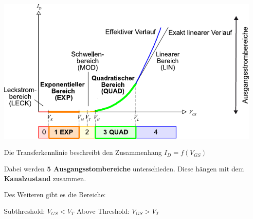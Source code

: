\begin{minipage}[t]{0.55\columnwidth}
    \includegraphics[width=\columnwidth, align=t]{images/MOSFET_transferkennlinie.pdf}
\end{minipage}
\hfill
\begin{minipage}[t]{0.42\columnwidth}
    Die Transferkennlinie beschreibt den Zusammenhang $I_D = f(V_{GS})$ 

    \smallskip

    Dabei werden \textbf{5 Ausgangsstombereiche} unterschieden. Diese hängen mit dem \textbf{Kanalzustand} zusammen.

    \smallskip

    Des Weiteren gibt es die Bereiche:

    \begin{outline}
        \1 Subthreshold: $V_{GS} < V_T$
        \1 Above Threshold: $V_{GS} > V_T$
    \end{outline}
\end{minipage}



